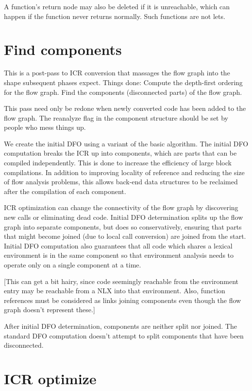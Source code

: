 A function's return node may also be deleted if it is unreachable, which can
happen if the function never returns normally.  Such functions are not lets.


\chapter{Find components}

This is a post-pass to ICR conversion that massages the flow graph into the
shape subsequent phases expect.  Things done:
  Compute the depth-first ordering for the flow graph.
  Find the components (disconnected parts) of the flow graph.

This pass need only be redone when newly converted code has been added to the
flow graph.  The reanalyze flag in the component structure should be set by
people who mess things up.

We create the initial DFO using a variant of the basic algorithm.  The initial
DFO computation breaks the ICR up into components, which are parts that can be
compiled independently.  This is done to increase the efficiency of large block
compilations.  In addition to improving locality of reference and reducing the
size of flow analysis problems, this allows back-end data structures to be
reclaimed after the compilation of each component.

ICR optimization can change the connectivity of the flow graph by discovering
new calls or eliminating dead code.  Initial DFO determination splits up the
flow graph into separate components, but does so conservatively, ensuring that
parts that might become joined (due to local call conversion) are joined from
the start.  Initial DFO computation also guarantees that all code which shares
a lexical environment is in the same component so that environment analysis
needs to operate only on a single component at a time.

[This can get a bit hairy, since code seemingly reachable from the
environment entry may be reachable from a NLX into that environment.  Also,
function references must be considered as links joining components even though
the flow graph doesn't represent these.]

After initial DFO determination, components are neither split nor joined.  The
standard DFO computation doesn't attempt to split components that have been
disconnected.


\chapter{ICR optimize}

